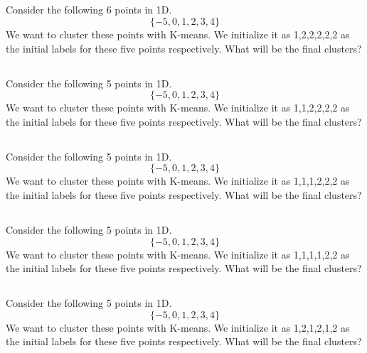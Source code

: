 \begin{frame}
\section{}
Consider the following 6 points in 1D.
\[ \{ -5, 0,1,2,3,4\} \]
We want to cluster these points with K-means. We initialize it as
1,2,2,2,2,2 as the initial labels for these five points respectively.
What will be the final clusters?


\end{frame}


\begin{frame}
\section{}
Consider the following 5 points in 1D.
\[ \{ -5, 0,1,2,3,4\} \]
We want to cluster these points with K-means. We initialize it as
1,1,2,2,2,2 as the initial labels for these five points respectively.
What will be the final clusters?



\end{frame}


\begin{frame}
\section{}
Consider the following 5 points in 1D.
\[ \{ -5, 0,1,2,3,4\} \]
We want to cluster these points with K-means. We initialize it as
1,1,1,2,2,2 as the initial labels for these five points respectively.
What will be the final clusters?



\end{frame}


\begin{frame}
\section{}
Consider the following 5 points in 1D.
\[ \{ -5, 0,1,2,3,4\} \]
We want to cluster these points with K-means. We initialize it as
1,1,1,1,2,2 as the initial labels for these five points respectively.
What will be the final clusters?



\end{frame}


\begin{frame}
\section{}
Consider the following 5 points in 1D.
\[ \{ -5, 0,1,2,3,4\} \]
We want to cluster these points with K-means. We initialize it as
1,2,1,2,1,2 as the initial labels for these five points respectively.
What will be the final clusters?


\end{frame}
